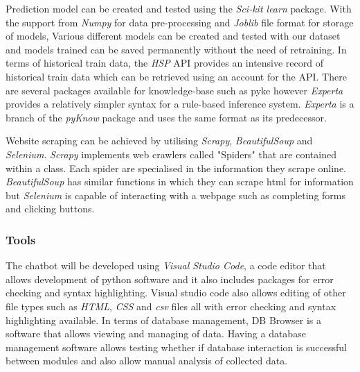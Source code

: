 \documentclass[11pt]{article}
\begin{document}
Prediction model can be created and tested using the \textit{Sci-kit learn} package. With the support from \textit{Numpy} for data pre-processing and \textit{Joblib} file format for storage of models, Various different models can be created and tested with our dataset and models trained can be saved permanently without the need of retraining. In terms of historical train data, the \textit{HSP} API provides an intensive record of historical train data which can be retrieved using an account for the API. There are several packages available for knowledge-base such as pyke however \textit{Experta} provides a relatively simpler syntax for a rule-based inference system. \textit{Experta} is a branch of the \textit{pyKnow} package and uses the same format as its predecessor.

Website scraping can be achieved by utilising \textit{Scrapy}, \textit{BeautifulSoup} and \textit{Selenium}. \textit{Scrapy} implements web crawlers called "Spiders" that are contained within a class. Each spider are specialised in the information they scrape online. \textit{BeautifulSoup} has similar functions in which they can scrape html for information but \textit{Selenium} is capable of interacting with a webpage such as completing forms and clicking buttons.

\subsubsection{Tools}
The chatbot will be developed using \textit{Visual Studio Code}, a code editor that allows development of python software and it also includes packages for error checking and syntax highlighting. Visual studio code also allows editing of other file types such as \textit{HTML}, \textit{CSS} and \textit{csv} files all with error checking and syntax highlighting available. In terms of database management, DB Browser is a software that allows viewing and managing of data. Having a database management software allows testing whether if database interaction is successful between modules and also allow manual analysis of collected data.
\end{document}
